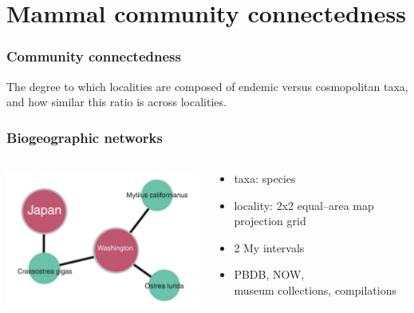\documentclass{beamer}
\begin{document}
\section{Mammal community connectedness}

\begin{frame}
  \frametitle{Community connectedness}
  \begin{definition}
    The degree to which localities are composed of endemic versus cosmopolitan taxa, and how similar this ratio is across localities.
  \end{definition}
\end{frame}

\begin{frame}
  \frametitle{Biogeographic networks}
  \begin{columns}
    \begin{column}{0.5\textwidth}
      \includegraphics[height = 0.8\textheight, width = \textwidth, keepaspectratio = true]{figure/vilhena}

      \tiny{}
    \end{column}
    \begin{column}{0.5\textwidth}
      \begin{itemize}
        \item taxa: species
        \item locality: 2x2 equal--area map projection grid
        \item 2 My intervals
        \item PBDB, NOW, \\museum collections, compilations
      \end{itemize}
    \end{column}
  \end{columns}
\end{frame}
\end{document}
